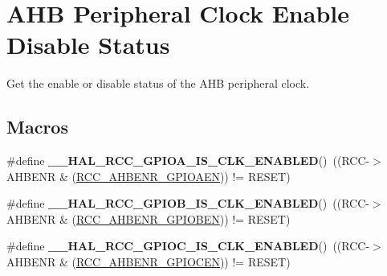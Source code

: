 \hypertarget{group___r_c_c___a_h_b___peripheral___clock___enable___disable___status}{\section{A\-H\-B Peripheral Clock Enable Disable Status}
\label{group___r_c_c___a_h_b___peripheral___clock___enable___disable___status}
}


Get the enable or disable status of the A\-H\-B peripheral clock.  


\subsection*{Macros}
\begin{DoxyCompactItemize}
\item 
\hypertarget{group___r_c_c___a_h_b___peripheral___clock___enable___disable___status_gad1edbd9407c814110f04c1a609a214e4}{\#define {\bfseries \-\_\-\-\_\-\-H\-A\-L\-\_\-\-R\-C\-C\-\_\-\-G\-P\-I\-O\-A\-\_\-\-I\-S\-\_\-\-C\-L\-K\-\_\-\-E\-N\-A\-B\-L\-E\-D}()~((R\-C\-C-\/$>$A\-H\-B\-E\-N\-R \& (\hyperlink{group___peripheral___registers___bits___definition_ga8909660b884f126ab1476daac7999619}{R\-C\-C\-\_\-\-A\-H\-B\-E\-N\-R\-\_\-\-G\-P\-I\-O\-A\-E\-N})) != R\-E\-S\-E\-T)}\label{group___r_c_c___a_h_b___peripheral___clock___enable___disable___status_gad1edbd9407c814110f04c1a609a214e4}

\item 
\hypertarget{group___r_c_c___a_h_b___peripheral___clock___enable___disable___status_ga2fc8f9dc5f5b64c14c325c45ee301b4f}{\#define {\bfseries \-\_\-\-\_\-\-H\-A\-L\-\_\-\-R\-C\-C\-\_\-\-G\-P\-I\-O\-B\-\_\-\-I\-S\-\_\-\-C\-L\-K\-\_\-\-E\-N\-A\-B\-L\-E\-D}()~((R\-C\-C-\/$>$A\-H\-B\-E\-N\-R \& (\hyperlink{group___peripheral___registers___bits___definition_gab7995351a5b0545e8cd86a228d97dcec}{R\-C\-C\-\_\-\-A\-H\-B\-E\-N\-R\-\_\-\-G\-P\-I\-O\-B\-E\-N})) != R\-E\-S\-E\-T)}\label{group___r_c_c___a_h_b___peripheral___clock___enable___disable___status_ga2fc8f9dc5f5b64c14c325c45ee301b4f}

\item 
\hypertarget{group___r_c_c___a_h_b___peripheral___clock___enable___disable___status_ga528029c120a0154dfd7cfd6159e8debe}{\#define {\bfseries \-\_\-\-\_\-\-H\-A\-L\-\_\-\-R\-C\-C\-\_\-\-G\-P\-I\-O\-C\-\_\-\-I\-S\-\_\-\-C\-L\-K\-\_\-\-E\-N\-A\-B\-L\-E\-D}()~((R\-C\-C-\/$>$A\-H\-B\-E\-N\-R \& (\hyperlink{group___peripheral___registers___bits___definition_ga7e5c4504b7adbb13372e7536123a756b}{R\-C\-C\-\_\-\-A\-H\-B\-E\-N\-R\-\_\-\-G\-P\-I\-O\-C\-E\-N})) != R\-E\-S\-E\-T)}\label{group___r_c_c___a_h_b___peripheral___clock___enable___disable___status_ga528029c120a0154dfd7cfd6159e8debe}


\end{DoxyCompactItemize}
